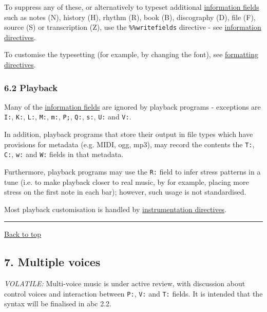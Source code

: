 To suppress any of these, or alternatively to typeset additional
\protect\hyperlink{information_field_definition}{information fields}
such as notes (N), history (H), rhythm (R), book (B), discography (D),
file (F), source (S) or transcription (Z), use the
\texttt{\%\%writefields} directive - see
\protect\hyperlink{information_directives}{information directives}.

To customise the typesetting (for example, by changing the font), see
\protect\hyperlink{formatting_directives}{formatting directives}.

\hypertarget{playback}{\subsubsection{6.2 Playback}\label{playback}}

Many of the \protect\hyperlink{information_field_definition}{information
fields} are ignored by playback programs - exceptions are \texttt{I:},
\texttt{K:}, \texttt{L:}, \texttt{M:}, \texttt{m:}, \texttt{P;},
\texttt{Q:}, \texttt{s:}, \texttt{U:} and \texttt{V:}.

In addition, playback programs that store their output in file types
which have provisions for metadata (e.g. MIDI, ogg, mp3), may record the
contents the \texttt{T:}, \texttt{C:}, \texttt{w:} and \texttt{W:}
fields in that metadata.

Furthermore, playback programs may use the \texttt{R:} field to infer
stress patterns in a tune (i.e. to make playback closer to real music,
by for example, placing more stress on the first note in each bar);
however, such usage is not standardised.

Most playback customisation is handled by
\protect\hyperlink{instrumentation_directives}{instrumentation
directives}.

\begin{center}\rule{0.5\linewidth}{\linethickness}\end{center}

\protect\hyperlink{}{Back to top}

\hypertarget{multiple_voices}{\subsection{7. Multiple
voices}\label{multiple_voices}}

\emph{VOLATILE:} Multi-voice music is under active review, with
discussion about control voices and interaction between \texttt{P:},
\texttt{V:} and \texttt{T:} fields. It is intended that the syntax will
be finalised in abc 2.2.

